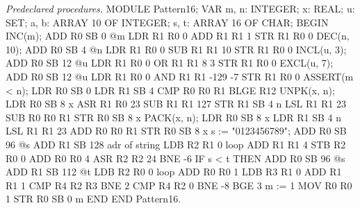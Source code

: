 \noindent {} \emph{Predeclared procedures.}
\begintt
MODULE Pattern16;
  VAR m, n: INTEGER;
    x: REAL; u: SET;
    a, b: ARRAY 10 OF INTEGER;
    s, t: ARRAY 16 OF CHAR;
BEGIN
  INC(m);               ADD R0 SB 0     @m
                        LDR R1 R0 0
                        ADD R1 R1 1
                        STR R1 R0 0
  DEC(n, 10);           ADD R0 SB 4     @n
                        LDR R1 R0 0
                        SUB R1 R1 10
                        STR R1 R0 0
  INCL(u, 3);           ADD R0 SB 12    @u
                        LDR R1 R0 0
                        OR  R1 R1 8     {3}
                        STR R1 R0 0
  EXCL(u, 7);           ADD R0 SB 12    @u
                        LDR R1 R0 0
                        AND R1 R1 -129  -{7}
                        STR R1 R0 0
  ASSERT(m < n);        LDR R0 SB 0
                        LDR R1 SB 4
                        CMP R0 R0 R1
                        BLGE R12
  UNPK(x, n);           LDR R0 SB 8     x
                        ASR R1 R0 23
                        SUB R1 R1 127
                        STR R1 SB 4     n
                        LSL R1 R1 23
                        SUB R0 R0 R1
                        STR R0 SB 8     x
  PACK(x, n);           LDR R0 SB 8     x
                        LDR R1 SB 4     n
                        LSL R1 R1 23
                        ADD R0 R0 R1
                        STR R0 SB 8     x
  s := "0123456789";    ADD R0 SB 96    @s
                        ADD R1 SB 128   adr of string
                        LDB R2 R1 0     loop
                        ADD R1 R1 4
                        STB R2 R0 0
                        ADD R0 R0 4
                        ASR R2 R2 24
                        BNE -6
  IF s < t THEN         ADD R0 SB 96    @s
                        ADD R1 SB 112   @t
                        LDB R2 R0 0     loop
                        ADD R0 R0 1
                        LDB R3 R1 0
                        ADD R1 R1 1
                        CMP R4 R2 R3
                        BNE 2
                        CMP R4 R2 0
                        BNE -8
                        BGE 3
    m := 1              MOV R0 R0 1
                        STR R0 SB 0     m
  END
END Pattern16.
\endtt

